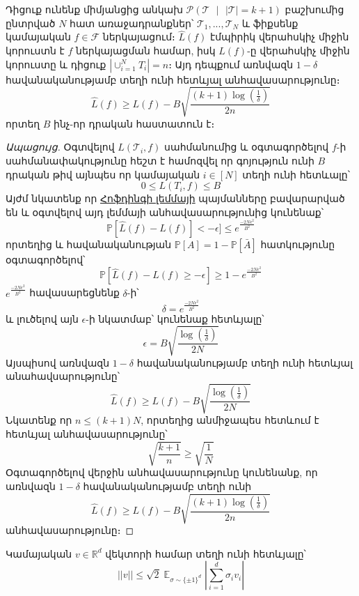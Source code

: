 \documentclass[11pt]{article}
\DeclareMathOperator*{\E}{\mathbb{E}}
\begin{document}
\begin{lemma}
\label{task_conc_lemm}
Դիցուք ունենք միմյանցից անկախ $\mathcal{P}(\mathcal{T} \text{ } |\text{ }  |\mathcal{T}| = k +1)$ բաշխումից ընտրված $N$ հատ առաջադրանքներ՝ $\mathcal{T}_1, ..., \mathcal{T}_N$ և ֆիքսենք կամայական $f \in \mathcal{F}$ ներկայացում։ $\hat{L}(f)$ էմպիրիկ վերահսկիչ միջին կորուստն է $f$ ներկայացման համար,  իսկ $L(f)$-ը վերահսկիչ միջին կորուստը և դիցուք $|\cup_{i=1}^N{T_i}| = n$։
Այդ դեպքում առնվազն $1-\delta$ հավանականությամբ տեղի ունի հետևյալ անհավասարությունը։
\begin{equation}
\hat{L}(f) \geq L(f) - B\sqrt{\frac{\left(k+1\right)\log \left(\frac{1}{\delta}\right) }{2n}}
\end{equation}
որտեղ $B$ ինչ-որ դրական հաստատուն է։
\end{lemma}
\begin{proof}[Ապացույց]
Օգտվելով $L(\mathcal{T}_i, f)$ սահմանումից և օգտագործելով $f$-ի սահմանափակությունը հեշտ է համոզվել որ գոյություն ունի $B$ դրական թիվ այնպես որ կամայական $i \in [N]$ տեղի ունի հետևալը՝
$$0 \leq L(T_i,f) \leq B$$
Այժմ նկատենք որ \hyperref [hofding_inq]{Հոֆդինգի լեմմայի} պայմանները բավարարված են և օգտվելով այդ լեմմայի անհավասարությունից կունենաք՝
$$\mathbb{P}[\hat{L}(f) - L(f)]< -\epsilon] \leq e^{\frac{-2N\epsilon^2}{B^2}}$$
որտեղից և հավանականության $\mathbb{P}[A] = 1 - \mathbb{P}[\bar A]$ հատկությունը օգտագործելով՝
$$\mathbb{P}[\hat{L}(f) - L(f) \geq -\epsilon] \geq 1 -e^{\frac{-2N\epsilon^2}{B^2}} $$
$e^{\frac{-2N\epsilon^2}{B^2}}$ հավասարեցնենք $\delta$-ի՝
$$\delta = e^{\frac{-2N\epsilon^2}{B^2}}$$
և լուծելով այն $\epsilon$-ի նկատմաբ՝ կունենաք հետևյալը՝
$$\epsilon = B \sqrt{ \frac{\log\left(\frac{1}{\delta}\right)}{2N}} $$
Այսպիսով առնվազն $1-\delta$ հավանականությամբ տեղի ունի հետևյալ անահավսարությունը՝
$$\hat{L}(f) \geq L(f) - B \sqrt{ \frac{\log\left(\frac{1}{\delta}\right)}{2N}}$$
Նկատենք որ $n \leq (k+1)N$, որտեղից անմիջապես հետևում է հետևյալ անհավասարությունը՝
$$\sqrt{\frac{k+1}{n}} \geq \sqrt{\frac{1}{N}}$$
Օգտագործելով վերջին անհավասարությունը կունենանք, որ առնվազն $1-\delta$ հավանականությամբ տեղի ունի
$$\hat{L}(f) \geq L(f) - B\sqrt{\frac{\left(k+1\right)\log \left(\frac{1}{\delta}\right) }{2n}}$$
անհավասարությունը։
\end{proof}
\begin{preposition}
\label{prep_vec_ineq}
Կամայական $v \in \mathbb{R}^d$ վեկտորի համար տեղի ունի հետևյալը՝
$$||v|| \leq \sqrt{2}\E_{\sigma \sim \{\pm1\}^d} \left| \sum_{i=1}^d \sigma_iv_i \right|$$
\end{preposition}
\end{document}
